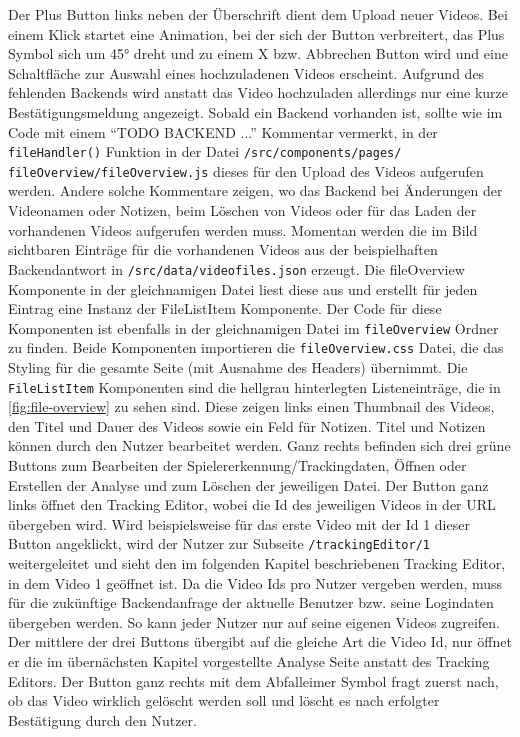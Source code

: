 Der Plus Button links neben der Überschrift dient dem Upload neuer Videos. Bei einem Klick startet eine Animation, bei der sich der Button verbreitert, das Plus Symbol sich um 45° dreht und zu einem X bzw. Abbrechen Button wird und eine Schaltfläche zur Auswahl eines hochzuladenen Videos erscheint. Aufgrund des fehlenden Backends wird anstatt das Video hochzuladen allerdings nur eine kurze Bestätigungsmeldung angezeigt. Sobald ein Backend vorhanden ist, sollte wie im Code mit einem ``TODO BACKEND ...'' Kommentar vermerkt, in der \texttt{fileHandler()} Funktion in der Datei \texttt{/src/components/pages/ fileOverview/fileOverview.js} dieses für den Upload des Videos aufgerufen werden. Andere solche Kommentare zeigen, wo das Backend bei Änderungen der Videonamen oder Notizen, beim Löschen von Videos oder für das Laden der vorhandenen Videos aufgerufen werden muss.  Momentan werden die im Bild sichtbaren Einträge für die vorhandenen Videos aus der beispielhaften Backendantwort in \texttt{/src/data/videofiles.json} erzeugt. Die fileOverview Komponente in der gleichnamigen Datei liest diese aus und erstellt für jeden Eintrag eine Instanz der FileListItem Komponente. Der Code für diese Komponenten ist ebenfalls in der gleichnamigen Datei im \texttt{fileOverview} Ordner zu finden. Beide Komponenten importieren die \texttt{fileOverview.css} Datei, die das Styling für die gesamte Seite (mit Ausnahme des Headers) übernimmt. Die \texttt{FileListItem} Komponenten sind die hellgrau hinterlegten Listeneinträge, die in \autoref{fig:file-overview} zu sehen sind. Diese zeigen links einen Thumbnail des Videos, den Titel und Dauer des Videos sowie ein Feld für Notizen. Titel und Notizen können durch den Nutzer bearbeitet werden. Ganz rechts befinden sich drei grüne Buttons zum Bearbeiten der Spielererkennung/Trackingdaten, Öffnen oder Erstellen der Analyse und zum Löschen der jeweiligen Datei. Der Button ganz links öffnet den Tracking Editor, wobei die Id des jeweiligen Videos in der URL übergeben wird. Wird beispielsweise für das erste Video mit der Id 1 dieser Button angeklickt, wird der Nutzer zur Subseite \texttt{/trackingEditor/1} weitergeleitet und sieht den im folgenden Kapitel beschriebenen Tracking Editor, in dem Video 1 geöffnet ist. Da die Video Ids pro Nutzer vergeben werden, muss für die zukünftige Backendanfrage der aktuelle Benutzer bzw. seine Logindaten übergeben werden. So kann jeder Nutzer nur auf seine eigenen Videos zugreifen. Der mittlere der drei Buttons übergibt auf die gleiche Art die Video Id, nur öffnet er die im übernächsten Kapitel vorgestellte Analyse Seite anstatt des Tracking Editors. Der Button ganz rechts mit dem Abfalleimer Symbol fragt zuerst nach, ob das Video wirklich gelöscht werden soll und löscht es nach erfolgter Bestätigung durch den Nutzer.
